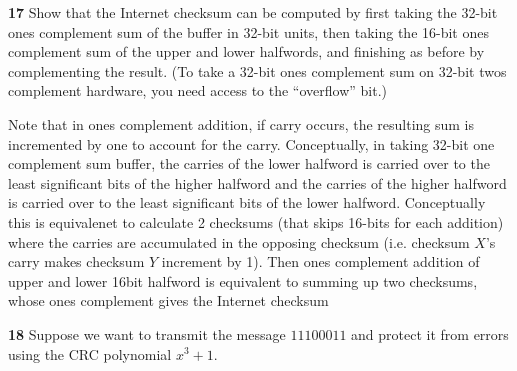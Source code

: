 \documentclass[11pt]{article}
\begin{document}
\textbf{17} Show that the Internet checksum can be computed by first taking the 32-bit ones complement sum of the buffer in 32-bit units, then taking the 16-bit ones complement sum of the upper and lower halfwords, and finishing as before by complementing the result. (To take a 32-bit ones complement sum on 32-bit twos complement hardware, you need access to the “overflow” bit.)
\begin{solution}
    Note that in ones complement addition, if carry occurs, the resulting sum is incremented by one to account for the carry. Conceptually, in taking 32-bit one complement sum buffer, the carries of the lower halfword is carried over to the least significant bits of the higher halfword and the carries of the higher halfword is carried over to the least significant bits of the lower halfword. Conceptually this is equivalenet to calculate 2 checksums (that skips 16-bits for each addition) where the carries are accumulated in the opposing checksum (i.e. checksum $X$'s carry makes checksum $Y$ increment by 1). Then ones complement addition of upper and lower 16bit halfword is equivalent to summing up two checksums, whose ones complement gives the Internet checksum
\end{solution}
\textbf{18}  Suppose we want to transmit the message $11100011$ and protect it from errors using the CRC polynomial $x^3 + 1$.
\end{document}
